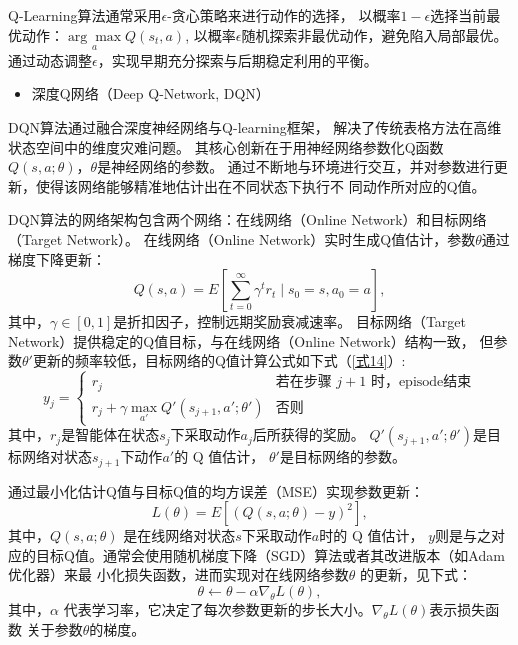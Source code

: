 Q-Learning算法通常采用$ \epsilon$-贪心策略来进行动作的选择，
以概率$1- \epsilon $选择当前最优动作：$\underset{a}{\arg\max}Q( s_{t},a) $,
以概率$\epsilon$随机探索非最优动作，避免陷入局部最优。
通过动态调整$\epsilon$，实现早期充分探索与后期稳定利用的平衡。

\begin{itemize}
    \item 深度Q网络（Deep Q-Network, DQN）
\end{itemize}

DQN算法通过融合深度神经网络与Q-learning框架，
解决了传统表格方法在高维状态空间中的维度灾难问题。
其核心创新在于用神经网络参数化Q函数$Q(s,a;\theta)$，$\theta $是神经网络的参数。
通过不断地与环境进行交互，并对参数进行更新，使得该网络能够精准地估计出在不同状态下执行不
同动作所对应的Q值。

DQN算法的网络架构包含两个网络：在线网络（Online Network）和目标网络（Target Network）。
在线网络（Online Network）实时生成Q值估计，参数$\theta $通过梯度下降更新：
\begin{equation}\label{式13}
    Q(s, a) = E \left[ \sum_{t = 0}^{\infty} \gamma^{t} r_{t} \mid s_{0} = s, a_{0} = a \right],
\end{equation}
其中，$\gamma\in [0,1]  $是折扣因子，控制远期奖励衰减速率。
目标网络（Target Network）提供稳定的Q值目标，与在线网络（Online Network）结构一致，
但参数$ \theta'$更新的频率较低，目标网络的Q值计算公式如下式（\ref{式14}）:
\begin{equation}\label{式14}
    y_{j} = 
    \begin{cases}
    r_{j} & \text{若在步骤 } j + 1 \text{ 时，episode结束}\\
    r_{j} + \gamma \max_{a'} Q'(s_{j + 1}, a'; \theta') & \text{否则}
    \end{cases}
\end{equation}
其中，$r_{j}$是智能体在状态$s_j $下采取动作$ a_j$后所获得的奖励。
$Q'(s_{j + 1}, a'; \theta') $是目标网络对状态$s_{j + 1} $下动作$ a' $的 Q 值估计，
$\theta' $是目标网络的参数。

通过最小化估计Q值与目标Q值的均方误差（MSE）实现参数更新：
\begin{equation}\label{式15}
    L(\theta) = E \left[ \left( Q(s, a; \theta) - y \right)^2 \right],
\end{equation}
其中，$ Q(s, a; \theta)$ 是在线网络对状态$s$下采取动作$a$时的 Q 值估计，
$y$则是与之对应的目标Q值。通常会使用随机梯度下降（SGD）算法或者其改进版本（如Adam优化器）来最
小化损失函数，进而实现对在线网络参数$\theta$ 的更新，见下式：
\begin{equation}\label{式16}
    \theta \leftarrow \theta - \alpha \nabla_{\theta} L(\theta),
\end{equation}
其中，$\alpha $ 代表学习率，它决定了每次参数更新的步长大小。$\nabla_{\theta} L(\theta) $表示损失函数
关于参数$ \theta$的梯度。

